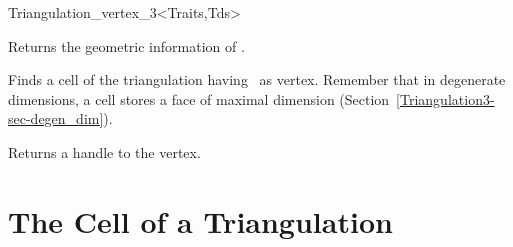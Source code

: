 \begin{ccClassTemplate}{Triangulation_vertex_3<Traits,Tds>}
\begin{ccAdvanced}
\end{ccAdvanced}

\ccAccessFunctions

{Returns the geometric information of \ccVar.}

{Finds a cell of the triangulation having \ccVar\ as
vertex. Remember that in degenerate dimensions, a cell stores a face
of maximal dimension (Section~\ref{Triangulation3-sec-degen_dim}).}

{Returns a handle to the vertex.}



	\end{ccClassTemplate} 

\section{The Cell of a Triangulation} 
\label{Triangulation3-sec-class-Cell}

